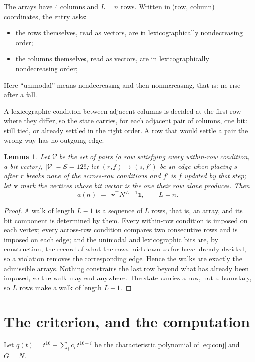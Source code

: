 \documentclass[11pt,a4paper]{article}
\theoremstyle{plain}
\newtheorem{lemma}[theorem]{Lemma}
\theoremstyle{definition}
\begin{document}
The arrays have $4$ columns and $L=n$ rows. Written in (row, column)
coordinates, the entry asks:
\begin{itemize}
\item the rows themselves, read as vectors, are in lexicographically nondecreasing order;
\item the columns themselves, read as vectors, are in lexicographically nondecreasing order;
\end{itemize}
Here ``unimodal'' means nondecreasing and then nonincreasing, that is: no rise after a fall.

A lexicographic condition between adjacent columns is decided
at the first row where they differ, so the state carries, for each adjacent pair of
columns, one bit: still tied, or already settled in the right order. A row that would
settle a pair the wrong way has no outgoing edge.

\begin{lemma}\label{lem:walk}
Let $\mathcal V$ be the set of pairs (a row satisfying every within-row condition, a
bit vector), $|\mathcal V|=S=128$; let $(r,f)\to(s,f')$ be an edge when placing $s$ after $r$
breaks none of the across-row conditions and $f'$ is $f$ updated by that step; let
$\mathbf{v}$ mark the vertices whose bit vector is the one their row alone produces.
Then
\[
a(n)\;=\;\,\mathbf{v}^{\!\top}N^{\,L-1}\mathbf{1},\qquad L=n.
\]
\end{lemma}

\begin{proof}
A walk of length $L-1$ is a sequence of $L$ rows, that is, an array, and its bit component
is determined by them. Every within-row condition is imposed on each vertex; every
across-row condition compares two consecutive rows and is imposed on each edge; and the
unimodal and lexicographic bits are, by construction, the record of what the rows laid down
so far have already decided, so a violation removes the corresponding edge. Hence the walks
are exactly the admissible arrays. Nothing constrains the last row beyond what has already
been imposed, so the walk may end anywhere. The state carries a row, not a boundary, so
$L$ rows make a walk of length $L-1$.
\end{proof}

\section{The criterion, and the computation}

Let $q(t)=t^{16}-\sum_i c_i\,t^{16-i}$ be the characteristic polynomial of
\eqref{eq:conj} and $G=N$.
\end{document}
